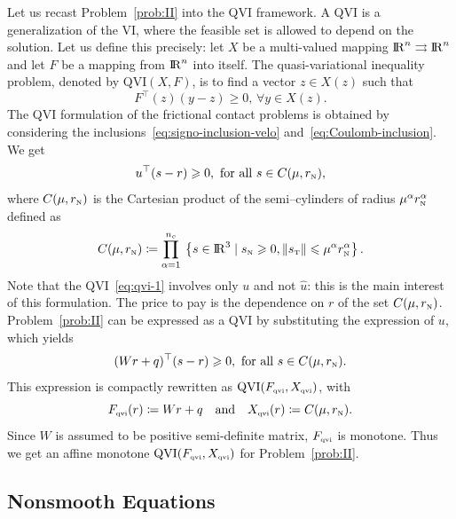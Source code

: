 {Let us recast Problem~\ref{prob:II} into the QVI framework. A QVI is a generalization of the VI, where the feasible set is allowed to depend on the solution. Let us define this precisely:
let $X$ be a multi-valued mapping  $\mathrm{I\!R}^{n} \rightrightarrows \mathrm{I\!R}^{n}$ and let  $F$ be a mapping from $\mathrm{I\!R}^n$ into itself.
The  quasi-variational inequality  problem, denoted by $\mathrm{QVI}(X,F)$, is to find a vector $z\in X(z)$ such that 
\begin{equation}
 \label{eq:qvi}
 F^{\top}(z) (y-z) \ge 0, \, \forall y \in X(z).
\end{equation}
The QVI formulation of the frictional contact problems is obtained by considering the inclusions~\eqref{eq:signo-inclusion-velo} and~\eqref{eq:Coulomb-inclusion}. We get 
\begin{equation}
  \label{eq:qvi-1}
  u^\top (s - r) \geq 0, \text{ for all } s \in C(\mu, r_\n),
\end{equation}
where $C(\mu, r_{\hbox{\tiny{N}}})$ is the Cartesian product of the semi--cylinders of radius $\mu^\alpha r_{\hbox{\tiny{N}}}^\alpha$ defined as
\begin{equation}
  \label{eq:cylinder}
  C(\mu, r_\n) \coloneqq \prod_{\alpha =1}^{n_c}\: \left\{ s \in \RR^3 \mid  s_\n \geq 0, \|s_\t\| \leq \mu^\alpha r^\alpha_\n\right\}.
\end{equation}
Note that the QVI~\eqref{eq:qvi-1} involves only $u$ and not $\hat u$: this is the main interest of this formulation. The price to pay is the dependence on $r$ of the set $C(\mu,r_{\hbox{\tiny{N}}})$.
Problem~\ref{prob:II} can be expressed as a QVI by substituting the expression of $u$, which yields
\begin{equation}
  \label{eq:qvi-IIbis}
   (Wr+q)^\top (s - r) \geq 0, \text{ for all } s \in C(\mu,r_\n).
\end{equation}
This expression is compactly rewritten as $\mathrm{QVI}(F_{{\hbox{\tiny{qvi}}}},X_{{\hbox{\tiny{qvi}}}})$, with 
\begin{equation}
  \label{eq:qvi-II}
  F_{\qvitwo}(r) \coloneqq  Wr+q \quad\text{and}\quad X_{\qvitwo}(r) \coloneqq C(\mu,r_\n) .
\end{equation}
Since $W$ is assumed to be positive semi-definite matrix, $F_{{\hbox{\tiny{qvi}}}}$ is monotone. Thus we get an affine monotone $\mathrm{QVI}(F_{{\hbox{\tiny{qvi}}}},X_{{\hbox{\tiny{qvi}}}})$ for Problem~\ref{prob:II}.


\subsection{Nonsmooth Equations}
\label{Sec:NonsmoothEquations}

}
